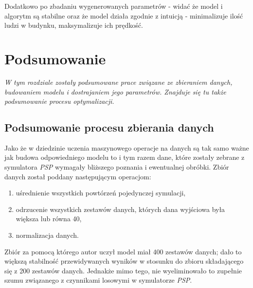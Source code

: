 \documentclass[12pt]{aghdpl}
\begin{document}
		Dodatkowo po zbadaniu wygenerowanych parametrów - widać że model i algorytm są stabilne oraz że model działa zgodnie z intuicją - minimalizuje ilość ludzi w budynku, maksymalizuje ich prędkość.
		
	\chapter{Podsumowanie}
	\textit{W tym rozdziale zostały podsumowane prace związane ze zbieraniem danych, budowaniem modelu i dostrajaniem jego parametrów. Znajduje się tu także podsumowanie procesu optymalizacji.}	
	
		\section{Podsumowanie procesu zbierania danych}
		Jako że w dziedzinie uczenia maszynowego operacje na danych są tak samo ważne jak budowa odpowiedniego modelu to i tym razem dane, które zostały zebrane z symulatora \textit{PSP} wymagały bliższego poznania i ewentualnej obróbki. Zbiór danych został poddany następującym operacjom:
		\begin{enumerate}
		\item uśrednienie wszystkich powtórzeń pojedynczej symulacji,
		\item odrzucenie wszystkich zestawów danych, których dana wyjściowa była większa lub równa 40,
		\item normalizacja danych.		
		\end{enumerate}
		
		Zbiór za pomocą którego autor uczył model miał 400 zestawów danych; dało to większą stabilność przewidywanych wyników w stosunku do zbioru składającego się z 200 zestawów danych. Jednakże mimo tego, nie wyeliminowało to zupełnie szumu związanego z czynnikami losowymi w symulatorze \textit{PSP}.
		
\end{document}

